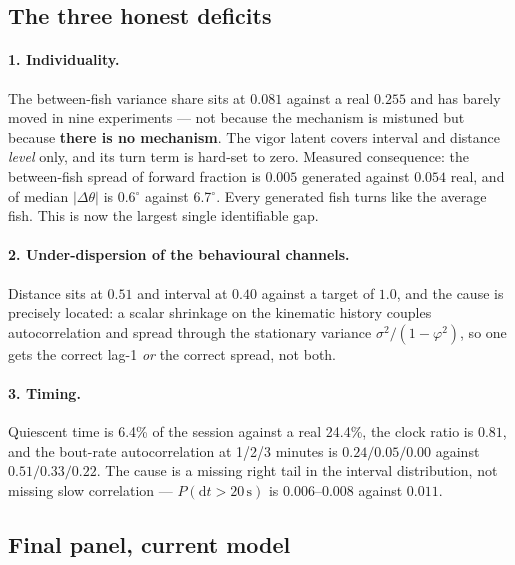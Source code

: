 \documentclass[11pt,a4paper]{article}
\newcommand{\uu}[1]{\ensuremath{\,\mathrm{#1}}}  %
\newcommand{\dg}{\ensuremath{^\circ}}             %
\newcommand{\dth}{\ensuremath{\Delta\theta}}
\begin{document}
\subsection{The three honest deficits}

\paragraph{1. Individuality.} The between-fish variance share sits at $0.081$ against a
real $0.255$ and has barely moved in nine experiments --- not because the mechanism is
mistuned but because \textbf{there is no mechanism}. The vigor latent covers interval and
distance \emph{level} only, and its turn term is hard-set to zero. Measured consequence:
the between-fish spread of forward fraction is $0.005$ generated against $0.054$ real, and
of median $|\dth|$ is 0.6\dg{} against 6.7\dg. Every generated fish
turns like the average fish. This is now the largest single identifiable gap.

\paragraph{2. Under-dispersion of the behavioural channels.} Distance sits at $0.51$ and
interval at $0.40$ against a target of $1.0$, and the cause is precisely located: a scalar
shrinkage on the kinematic history couples autocorrelation and spread through the
stationary variance $\sigma^2/(1-\varphi^2)$, so one gets the correct lag-1 \emph{or} the
correct spread, not both.

\paragraph{3. Timing.} Quiescent time is 6.4\% of the session against a real 24.4\%,
the clock ratio is $0.81$, and the bout-rate autocorrelation at 1/2/3 minutes is
$0.24/0.05/0.00$ against $0.51/0.33/0.22$. The cause is a missing right tail in the
interval distribution, not missing slow correlation --- $P(\mathrm{d}t > 20\uu{s})$
is $0.006$--$0.008$ against $0.011$.

\subsection{Final panel, current model}
\end{document}
